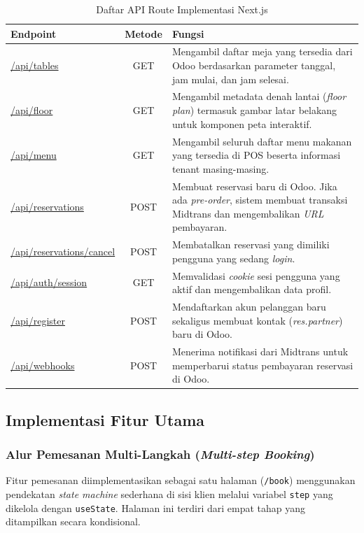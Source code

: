 \documentclass[conference]{IEEEtran}
\begin{document}
\begin{table}[htbp]
\caption{Daftar API Route Implementasi Next.js}
\label{tab:api_routes}
\centering
\begin{tabularx}{\linewidth}{|p{3.2cm}|c|X|}
\hline
\textbf{Endpoint} & \textbf{Metode} & \textbf{Fungsi} \\
\hline
\url{/api/tables} & GET & Mengambil daftar meja yang tersedia dari Odoo berdasarkan parameter tanggal, jam mulai, dan jam selesai. \\
\hline
\url{/api/floor} & GET & Mengambil metadata denah lantai (\textit{floor plan}) termasuk gambar latar belakang untuk komponen peta interaktif. \\
\hline
\url{/api/menu} & GET & Mengambil seluruh daftar menu makanan yang tersedia di POS beserta informasi tenant masing-masing. \\
\hline
\url{/api/reservations} & POST & Membuat reservasi baru di Odoo. Jika ada \textit{pre-order}, sistem membuat transaksi Midtrans dan mengembalikan \textit{URL} pembayaran. \\
\hline
\url{/api/reservations/cancel} & POST & Membatalkan reservasi yang dimiliki pengguna yang sedang \textit{login}. \\
\hline
\url{/api/auth/session} & GET & Memvalidasi \textit{cookie} sesi pengguna yang aktif dan mengembalikan data profil. \\
\hline
\url{/api/register} & POST & Mendaftarkan akun pelanggan baru sekaligus membuat kontak (\textit{res.partner}) baru di Odoo. \\
\hline
\url{/api/webhooks} & POST & Menerima notifikasi dari Midtrans untuk memperbarui status pembayaran reservasi di Odoo. \\
\hline
\end{tabularx}
\end{table}

\subsection{Implementasi Fitur Utama}

\subsubsection{Alur Pemesanan Multi-Langkah (\textit{Multi-step Booking})}
Fitur pemesanan diimplementasikan sebagai satu halaman (\texttt{/book}) menggunakan pendekatan \textit{state machine} sederhana di sisi klien melalui variabel \texttt{step} yang dikelola dengan \texttt{useState}. Halaman ini terdiri dari empat tahap yang ditampilkan secara kondisional.
\end{document}
